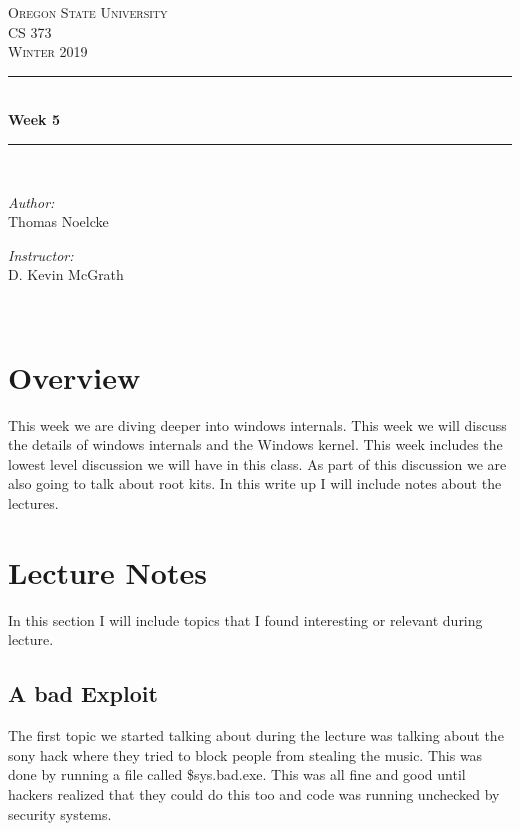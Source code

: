 \documentclass[letterpaper, onecolumn,10pt]{IEEEtran}
\begin{document}
    \begin{titlepage}
    \newcommand{\HRule}{\rule{\linewidth}{0.5mm}}
    \center
    \textsc{\Large Oregon State University}\\[1.5cm]
    \textsc{\Large CS 373}\\[0.5cm]
    \textsc{\Large Winter 2019}\\[0.5cm]
    \HRule \\[0.4cm]
    { \huge \bfseries Week 5}\\[0.4cm] %
    \HRule \\[1.5cm]
    \begin{minipage}{0.4\textwidth}
        \begin{flushleft} \large
        \emph{Author:}\\
        Thomas Noelcke
        \end{flushleft}
    \end{minipage}
    \begin{minipage}{0.4\textwidth}
        \begin{flushright} \large
        \emph{Instructor:} \\
        D. Kevin McGrath\\
        \end{flushright}
    \end{minipage}\\[2cm]
		\end{titlepage}
		
		
		\section{Overview}
		This week we are diving deeper into windows internals. This week we will discuss the details of windows internals and the Windows kernel. This week includes the lowest level discussion we will have in this class. As part of this discussion we are also going to talk about root kits. In this write up I will include notes about the lectures.\\
		
		\section{Lecture Notes}
		    In this section I will include topics that I found interesting or relevant during lecture.\\
		    
		    \subsection{A bad Exploit}
		    The first topic we started talking about during the lecture was talking about the sony hack where they tried to block people from stealing the music. This was done by running a file called \$sys.bad.exe. This was all fine and good until hackers realized that they could do this too and code was running unchecked by security systems.\\
		    
\end{document}

